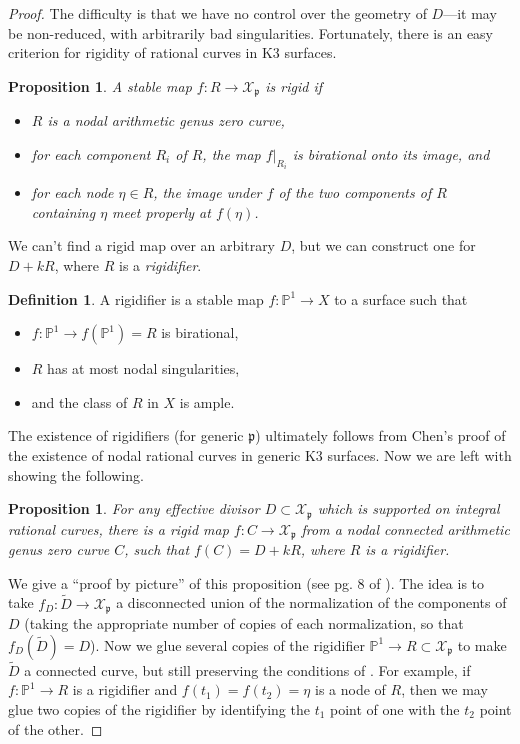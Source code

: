 \documentclass{amsart}
\renewcommand{\prime}{\mathfrak{p}}
\newcommand{\from}{\colon}
\theoremstyle{plain}
\newtheorem{proposition}[theorem]{Proposition}
\theoremstyle{definition}
\newtheorem{definition}[theorem]{Definition}
\theoremstyle{remark}
\begin{document}
\begin{proof}
The difficulty is that we have no control over the geometry of $D$---it may be non-reduced, with arbitrarily bad singularities. Fortunately, there is an easy criterion for rigidity of rational curves in K3 surfaces.
\begin{proposition}
\label{proposition:rigid-conditions}
A stable map $f:R \to \mathcal{X}_{\prime}$ is rigid if
\begin{itemize}
	\item $R$ is a nodal arithmetic genus zero curve,
	\item for each component $R_i$ of $R$, the map $f|_{R_i}$ is birational onto its image, and
	\item for each node $\eta \in R$, the image under $f$ of the 
	two components of $R$ containing $\eta$ meet properly at $f(\eta)$.
\end{itemize}
\end{proposition}
We can't find a rigid map over an arbitrary $D$, but we can construct one for $D+kR$, where $R$ is a 
\emph{rigidifier}.
\begin{definition}
A rigidifier is a stable map $f\from \mathbb{P}^1 \to X$ to a surface such that
\begin{itemize}
	\item $f\from \mathbb{P}^1 \to f(\mathbb{P}^1)=R$ is birational,
	\item $R$ has at most nodal singularities,
	\item and the class of $R$ in $X$ is ample.
 \end{itemize}
\end{definition}
The existence of rigidifiers (for generic $\prime$) ultimately follows from Chen's proof of the existence of nodal
rational curves in generic K3 surfaces. Now we are left with showing the following.
\begin{proposition}
For any effective divisor $D \subset \mathcal{X}_\prime$ which is supported on integral rational curves, 
there is a rigid map $f:C \to \mathcal{X}_\prime$ from a nodal connected arithmetic genus zero curve $C$,
such that $f(C)=D+kR$, where $R$ is a rigidifier.
\end{proposition}
We give a ``proof by picture'' of this proposition (see pg. 8 of \cite{LL}). The idea is to take $f_D:\tilde{D} \to \mathcal{X}_\prime$ a disconnected union of the normalization 
of the components of $D$ (taking the appropriate number of copies of each normalization, so that $f_D(\tilde{D})=D$). Now we glue several copies of the rigidifier $\mathbb{P}^1 \to R \subset \mathcal{X}_\prime$ to
make $\tilde{D}$ a connected curve, but still preserving the conditions of .
For example, if $f:\mathbb{P}^1 \to R$ is a rigidifier and $f(t_1)=f(t_2)=\eta$ is a node of $R$,
then we may glue two copies of the rigidifier by identifying the $t_1$ point of one with the $t_2$ point of the other. 
\end{proof}
\end{document}
